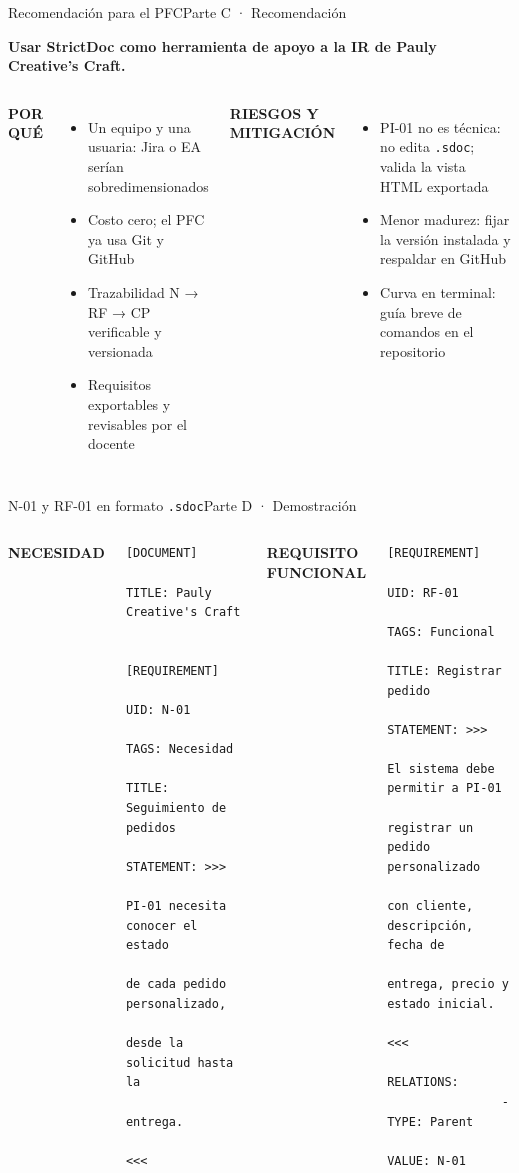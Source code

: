 \documentclass[aspectratio=169,11pt,t]{beamer}
\newcommand{\etiqueta}[1]{{\color{acento}\scriptsize\bfseries\MakeUppercase{#1}}\par\vspace{3pt}}
\begin{document}
	\begin{frame}{Recomendación para el PFC}{Parte C · Recomendación}
		{\fontsize{16}{20}\selectfont\bfseries Usar \textcolor{acento}{StrictDoc} como herramienta de apoyo a la IR de Pauly Creative's Craft.\par}
		\vspace{6pt}
		\begin{columns}[T]
			\etiqueta{Por qué}
			\small\begin{itemize}
				\item Un equipo y una usuaria: Jira o EA serían sobredimensionados
				\item Costo cero; el PFC ya usa Git y GitHub
				\item Trazabilidad N → RF → CP verificable y versionada
				\item Requisitos exportables y revisables por el docente
			\end{itemize}
			\etiqueta{Riesgos y mitigación}
			\small\begin{itemize}
				\item PI-01 no es técnica: no edita \texttt{.sdoc}; valida la vista HTML exportada
				\item Menor madurez: fijar la versión instalada y respaldar en GitHub
				\item Curva en terminal: guía breve de comandos en el repositorio
			\end{itemize}
		\end{columns}
	\end{frame}
	
	\begin{frame}[fragile]{N-01 y RF-01 en formato \texttt{.sdoc}}{Parte D · Demostración}
		\begin{columns}[T]
			\etiqueta{Necesidad}
			\begin{lstlisting}[style=sdoc]
				[DOCUMENT]
				TITLE: Pauly Creative's Craft
				
				[REQUIREMENT]
				UID: N-01
				TAGS: Necesidad
				TITLE: Seguimiento de pedidos
				STATEMENT: >>>
				PI-01 necesita conocer el estado
				de cada pedido personalizado,
				desde la solicitud hasta la
				entrega.
				<<<
			\end{lstlisting}
			\etiqueta{Requisito funcional}
			\begin{lstlisting}[style=sdoc]
				[REQUIREMENT]
				UID: RF-01
				TAGS: Funcional
				TITLE: Registrar pedido
				STATEMENT: >>>
				El sistema debe permitir a PI-01
				registrar un pedido personalizado
				con cliente, descripción, fecha de
				entrega, precio y estado inicial.
				<<<
				RELATIONS:
				- TYPE: Parent
				VALUE: N-01
			\end{lstlisting}
		\end{columns}
	\end{frame}
	
\end{document}
